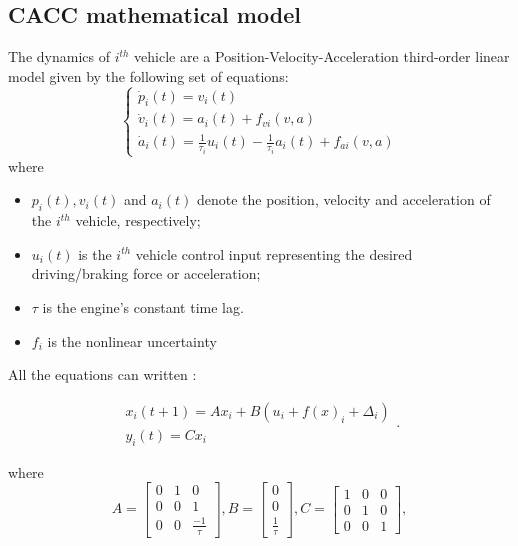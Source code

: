 \documentclass[letterpaper, 10pt, conference]{ieeeconf}  %
\begin{document}
\subsection{CACC mathematical model}
The dynamics of $i^{th}$ vehicle are a Position-Velocity-Acceleration third-order linear model given by the following set of equations:
\begin{equation}\label{eq_1}
      \left\{ \begin{array}{l}
        \dot{p}_i(t) =v_i(t) \\
        \dot{v}_i(t)  =a_i(t) + f_{vi}(v,a) \\
        \dot{a}_i(t)  =\frac{1}{\tau_i} u_i(t)-\frac{1}{\tau_i} a_i(t) + f_{ai}(v,a)  \end{array}  \right.
\end{equation}  
where
\begin{itemize}
\item $p_i(t), v_i(t)$ and $a_i(t)$ denote the position, velocity and
acceleration of the $i^{th}$  vehicle, respectively;
\item $u_i(t)$ is the $i^{th}$ vehicle control input representing the desired
driving/braking force or acceleration;
 \item $\tau$ is the engine's constant time lag. 
 \item $f_i$ is the nonlinear uncertainty 
 \end{itemize}

 All the equations can written :

\begin{equation}\label{CACC}
       \begin{array}{l}
        {x_i}(t+1)=A x_i + B  (u_i + f(x)_i + \Delta_i)  \\
        y_{i}(t) = Cx_{i}\end{array} .
\end{equation}  

where 
\begin{equation*}
        A  =\begin{bmatrix}
        0 & 1 & 0 \\
        0 & 0 & 1 \\
        0 & 0 & \frac{-1}{\tau}
          \end{bmatrix},
        B =\begin{bmatrix}
        0 \\
        0 \\
        \frac{1}{\tau}
          \end{bmatrix}, 
        C =\begin{bmatrix}
        1 & 0 & 0 \\
        0 & 1 & 0 \\
        0 & 0 & 1
          \end{bmatrix}, 
\end{equation*}
\end{document}

